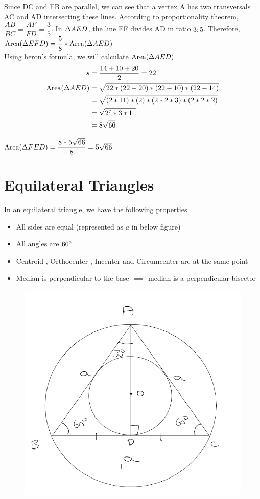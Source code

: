 Since DC and EB are parallel, we can see that a vertex A has two transversals AC and AD intersecting these lines. According to proportionality theorem, $\dfrac{AB}{BC} = \dfrac{AF}{FD} = \dfrac{3}{5}$. In $\Delta {AED}$, the line EF divides AD in ratio $3 : 5$. Therefore, $\text{Area}({\Delta {EFD}}) = \dfrac{5}{8} * \text{Area}({\Delta {AED}})$ \\

Using heron's formula, we will calculate $\text{Area}({\Delta {AED}})$
\begin{align*}
    s &= \dfrac{14 + 10 + 20}{2} = 22 \\
    \text{Area}({\Delta {AED}}) &= \sqrt{22 * (22 - 20) * (22 - 10) * (22 - 14)} \\
    &= \sqrt{(2 * 11) * (2) * (2 * 2 * 3) * (2 * 2 * 2)} \\
    &= \sqrt{2^7 * 3 * 11} \\
    &= 8 \sqrt{66}
\end{align*}

$\text{Area}({\Delta {FED}}) = \dfrac{8 * 5 \sqrt{66}}{8} = 5 \sqrt{66}$

\newpage











\section{Equilateral Triangles}
In an equilateral triangle, we have the following properties
\begin{itemize}
    \item All sides are equal (represented as $a$ in below figure)
    \item All angles are ${60}^{\circ}$
    \item Centroid , Orthocenter , Incenter and Circumcenter are at the same point
    \item Median is perpendicular to the base $\implies$ median is a perpendicular bisector
\end{itemize}

\begin{figure}[h!]
    \centering
    \includegraphics[width=0.5\linewidth]{Quant//Geometry//Images//Triangles/triangle_13_equilateral_theory.png}
\end{figure}

